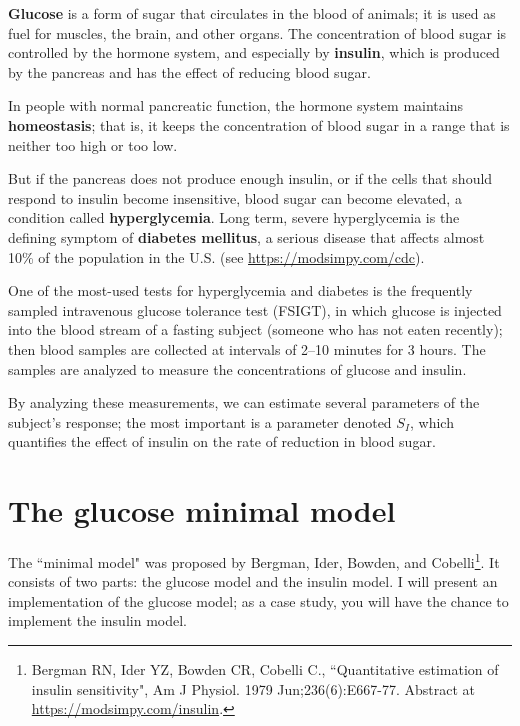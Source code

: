 \documentclass[12pt]{book}
\theoremstyle{exercise}
\begin{document}
{\bf Glucose} is a form of sugar that circulates in the blood of animals; it is used as fuel for muscles, the brain, and other organs.  The concentration of blood sugar is controlled by the hormone system, and especially by {\bf insulin}, which is produced by the pancreas and has the effect of reducing blood sugar.


In people with normal pancreatic function, the hormone system maintains {\bf homeostasis}; that is, it keeps the concentration of blood sugar in a range that is neither too high or too low.

But if the pancreas does not produce enough insulin, or if the cells that should respond to insulin become insensitive, blood sugar can become elevated, a condition called {\bf hyperglycemia}.  Long term, severe hyperglycemia is the defining symptom of {\bf diabetes mellitus}, a serious disease that affects almost 10\% of the population in the U.S. (see \url{https://modsimpy.com/cdc}).


One of the most-used tests for hyperglycemia and diabetes is the frequently sampled intravenous glucose tolerance test (FSIGT), in which glucose is injected into the blood stream of a fasting subject (someone who has not eaten recently); then blood samples are collected at intervals of 2--10 minutes for 3 hours.  The samples are analyzed to measure the concentrations of glucose and insulin.


By analyzing these measurements, we can estimate several parameters of the subject's response; the most important is a parameter denoted $S_I$, which quantifies the effect of insulin on the rate of reduction in blood sugar.


\section{The glucose minimal model}

The ``minimal model" was proposed by Bergman, Ider, Bowden, and Cobelli\footnote{Bergman RN, Ider YZ, Bowden CR, Cobelli C., ``Quantitative estimation of insulin sensitivity", Am J Physiol. 1979 Jun;236(6):E667-77.  Abstract at \url{https://modsimpy.com/insulin}.}.
It consists of two parts: the glucose model and the insulin model.  I will present an implementation of the glucose model; as a case study, you will have the chance to implement the insulin model.
\end{document}
